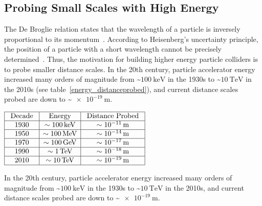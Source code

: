 \subsection{Probing Small Scales with High Energy}
The De Broglie relation states that the wavelength of a particle is inversely proportional to its momentum~\cite{de1924recherches}.
According to Heisenberg's uncertainty principle, the position of a particle with a short wavelength cannot be precisely determined~\cite{Heisenberg1927}.
Thus, the motivation for building higher energy particle colliders is to probe smaller distance scales.
In the 20th century, particle accelerator energy increased many orders of magnitude from \sim$\SI{100}{\keV}$ in the 1930s to \sim$\SI{10}{\TeV}$ in the 2010s (see table~\ref{energy_distanceprobed}), and current distance scales probed are down to \sim$\SI{e-19}{\m}$.
\begin{table}[htb]
\begin{center}
\begin{math}
\begin{array}{|c|c|c|}
\hline \text { Decade } & \text { Energy } & \text { Distance Probed } \\
\hline 1930 & \sim \SI{100}{\keV} & \sim \SI{e-11}{\m} \\
\hline 1950 & \sim \SI{100}{\MeV} & \sim \SI{e-14}{\m} \\
\hline 1970 & \sim \SI{100}{\GeV} & \sim \SI{e-17}{\m} \\
\hline 1990 & \sim \SI{1}{\TeV} & \sim \SI{e-18}{\m} \\
\hline 2010 & \sim \SI{10}{\TeV} & \sim \SI{e-19}{\m} \\
\hline
\end{array}
\end{math}
\caption{In the 20th century, particle accelerator energy increased many orders of magnitude from \sim$\SI{100}{\keV}$ in the 1930s to \sim$\SI{10}{\TeV}$ in the 2010s, and current distance scales probed are down to \sim$\SI{e-19}{\m}$.
        }
\label{energy_distanceprobed}
\end{center}
\end{table}


